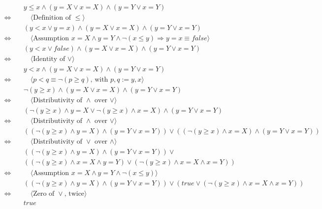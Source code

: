 \documentclass{article}
\begin{document}
\begin{align*}
        & \quad y \leq x \land (y = X \vee x = X) \land (y = Y \vee x = Y) \\
        \Longleftrightarrow & \qquad \langle \text{Definition of } \leq \rangle \\
        & \quad (y < x \vee y = x) \land (y = X \vee x = X) \land (y = Y \vee x = Y) \\
        \Longleftrightarrow & \qquad \langle \text{Assumption } x = X \land y = Y \land \neg(x \leq y) \Longrightarrow y = x \equiv false \rangle \\
        & \quad (y < x \vee false) \land (y = X \vee x = X) \land (y = Y \vee x = Y) \\
        \Longleftrightarrow & \qquad \langle \text{Identity of  } \vee \rangle \\
        & \quad y < x \land (y = X \vee x = X) \land (y = Y \vee x = Y) \\
        \Longleftrightarrow & \qquad \langle p < q \equiv \neg(p \geq q) \text{, with } p, q := y, x \rangle \\
        & \quad \neg(y \geq x) \land (y = X \vee x = X) \land (y = Y \vee x = Y) \\
        \Longleftrightarrow & \qquad \langle \text{Distributivity of } \land \text{ over } \vee \rangle \\
        & \quad (\neg(y \geq x) \land y = X \vee \neg(y \geq x) \land x = X) \land (y = Y \vee x = Y) \\
        \Longleftrightarrow & \qquad \langle \text{Distributivity of } \land \text{ over } \vee \rangle \\
        & \quad ((\neg(y \geq x) \land y = X) \land (y = Y \vee x = Y)) \vee ((\neg(y \geq x) \land x = X) \land (y = Y \vee x = Y)) \\
        \Longleftrightarrow & \qquad \langle \text{Distributivity of } \vee \text{ over } \land \rangle \\
        & \quad ((\neg(y \geq x) \land y = X) \land (y = Y \vee x = Y)) \vee \\
        & \quad ((\neg(y \geq x) \land x = X \land y = Y) \vee (\neg(y \geq x) \land x = X \land x = Y)) \\
        \Longleftrightarrow & \qquad \langle \text{Assumption } x = X \land y = Y \land \neg(x \leq y) \rangle \\
        & \quad ((\neg(y \geq x) \land y = X) \land (y = Y \vee x = Y)) \vee (true \vee (\neg(y \geq x) \land x = X \land x = Y)) \\
        \Longleftrightarrow & \qquad \langle \text{Zero of } \vee \text{, twice} \rangle \\
        & \quad true
\end{align*}
\end{document}
